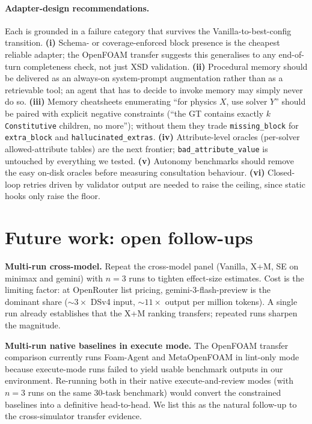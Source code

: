 \documentclass{article}
\begin{document}
\paragraph{Adapter-design recommendations.} Each is grounded in a failure category that survives the Vanilla-to-best-config transition. \textbf{(i)} Schema- or coverage-enforced block presence is the cheapest reliable adapter; the OpenFOAM transfer suggests this generalises to any end-of-turn completeness check, not just XSD validation. \textbf{(ii)} Procedural memory should be delivered as an always-on system-prompt augmentation rather than as a retrievable tool; an agent that has to decide to invoke memory may simply never do so. \textbf{(iii)} Memory cheatsheets enumerating ``for physics $X$, use solver $Y$'' should be paired with explicit negative constraints (``the GT contains exactly $k$ \texttt{Constitutive} children, no more''); without them they trade \texttt{missing\_block} for \texttt{extra\_block} and \texttt{hallucinated\_extras}. \textbf{(iv)} Attribute-level oracles (per-solver allowed-attribute tables) are the next frontier; \texttt{bad\_attribute\_value} is untouched by everything we tested. \textbf{(v)} Autonomy benchmarks should remove the easy on-disk oracles before measuring consultation behaviour. \textbf{(vi)} Closed-loop retries driven by validator output are needed to raise the ceiling, since static hooks only raise the floor.

\iffalse %
\section{Future work: open follow-ups}
\label{app:future-work}

\textbf{Multi-run cross-model.} Repeat the cross-model panel (Vanilla, X+M, SE on minimax and gemini) with $n=3$ runs to tighten effect-size estimates. Cost is the limiting factor: at OpenRouter list pricing, gemini-3-flash-preview is the dominant share (${\sim}3\times$ DSv4 input, ${\sim}11\times$ output per million tokens). A single run already establishes that the X+M ranking transfers; repeated runs sharpen the magnitude.

\textbf{Multi-run native baselines in execute mode.} The OpenFOAM transfer comparison currently runs Foam-Agent and MetaOpenFOAM in lint-only mode because execute-mode runs failed to yield usable benchmark outputs in our environment. Re-running both in their native execute-and-review modes (with $n=3$ runs on the same 30-task benchmark) would convert the constrained baselines into a definitive head-to-head. We list this as the natural follow-up to the cross-simulator transfer evidence.
\end{document}
